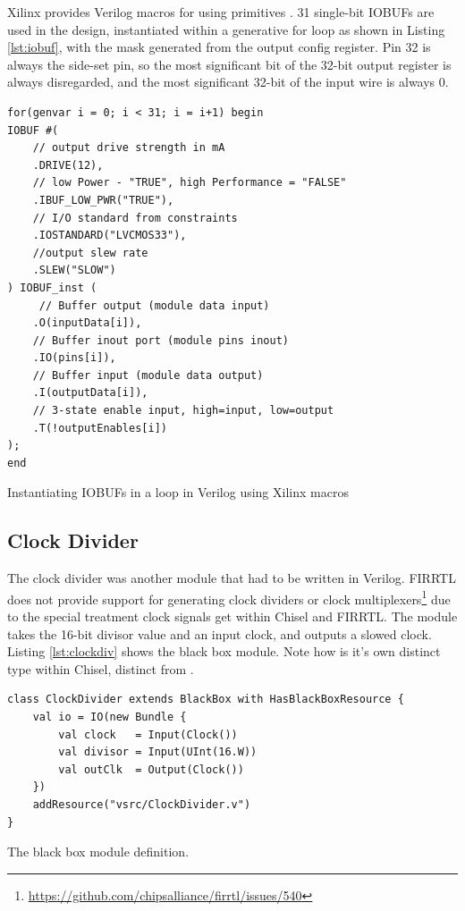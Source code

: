 Xilinx provides Verilog macros for using primitives \cite{vivado_libs}. 31 single-bit IOBUFs are used in the design, instantiated within a generative for loop as shown in Listing \ref{lst:iobuf}, with the  mask generated from the output config register. Pin 32 is always the side-set pin, so the most significant bit of the 32-bit output register is always disregarded, and the most significant 32-bit of the input wire is always 0.

\begin{listing}[h!]
    \vspace{0.5cm}
    \begin{verbatim}
for(genvar i = 0; i < 31; i = i+1) begin
IOBUF #( 
    // output drive strength in mA
    .DRIVE(12), 
    // low Power - "TRUE", high Performance = "FALSE"
    .IBUF_LOW_PWR("TRUE"),  
    // I/O standard from constraints
    .IOSTANDARD("LVCMOS33"),
    //output slew rate 
    .SLEW("SLOW") 
) IOBUF_inst (
     // Buffer output (module data input)
    .O(inputData[i]),
    // Buffer inout port (module pins inout)     
    .IO(pins[i]),   
    // Buffer input (module data output)
    .I(outputData[i]),     
    // 3-state enable input, high=input, low=output
    .T(!outputEnables[i])     
);
end
    \end{verbatim}
    \caption{Instantiating IOBUFs in a loop in Verilog using Xilinx macros \cite{vivado_libs}}
    \label{lst:iobuf}
\end{listing}

\subsection{Clock Divider}

The clock divider was another module that had to be written in Verilog. FIRRTL does not provide support for generating clock dividers or clock multiplexers\footnote{\url{https://github.com/chipsalliance/firrtl/issues/540}} due to the special treatment clock signals get within Chisel and FIRRTL. The module takes the 16-bit divisor value and an input clock, and outputs a slowed clock. Listing \ref{lst:clockdiv} shows the black box module. Note how  is it's own distinct type within Chisel, distinct from .

\begin{listing}[h!]
    \centering
    \vspace{0.5cm}
    \begin{verbatim}
class ClockDivider extends BlackBox with HasBlackBoxResource {
    val io = IO(new Bundle {
        val clock   = Input(Clock())
        val divisor = Input(UInt(16.W))
        val outClk  = Output(Clock())
    })
    addResource("vsrc/ClockDivider.v")
}
    \end{verbatim}
    \caption{The  black box module definition.}
    \label{lst:clockdiv}
\end{listing}

